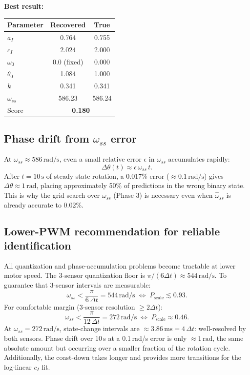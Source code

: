 \documentclass[11pt,a4paper]{article}
\begin{document}
\textbf{Best result:}
\begin{center}
\begin{tabular}{lcc}
\hline
Parameter & Recovered & True \\ \hline
$a_I$ & 0.764 & 0.755 \\
$c_I$ & 2.024 & 2.000 \\
$\omega_0$ & 0.0 (fixed) & 0.000 \\
$\theta_0$ & 1.084 & 1.000 \\
$k$ & 0.341 & 0.341 \\
$\omega_{ss}$ & 586.23 & 586.24 \\
\hline
Score & \multicolumn{2}{c}{\textbf{0.180}} \\
\hline
\end{tabular}
\end{center}

\subsection{Phase drift from $\omega_{ss}$ error}

At $\omega_{ss} \approx 586\,\text{rad/s}$, even a small relative error
$\epsilon$ in $\omega_{ss}$ accumulates rapidly:
\[
  \Delta\theta(t) \approx \epsilon\,\omega_{ss}\,t.
\]
After $t = 10\,\text{s}$ of steady-state rotation, a 0.017\% error
($\approx 0.1\,\text{rad/s}$) gives $\Delta\theta \approx 1\,\text{rad}$,
placing approximately 50\% of predictions in the wrong binary state.
This is why the grid search over $\omega_{ss}$ (Phase 3) is necessary
even when $\hat\omega_{ss}$ is already accurate to 0.02\%.

\subsection{Lower-PWM recommendation for reliable identification}

All quantization and phase-accumulation problems become tractable at lower
motor speed.  The 3-sensor quantization floor is $\pi/(6\Delta t) \approx 544\,\text{rad/s}$.
To guarantee that 3-sensor intervals are measurable:
\[
  \omega_{ss} < \frac{\pi}{6\,\Delta t} = 544\,\text{rad/s}
  \;\Longleftrightarrow\;
  P_{\text{scale}} \lesssim 0.93.
\]
For comfortable margin (3-sensor resolution $\geq 2\Delta t$):
\[
  \omega_{ss} < \frac{\pi}{12\,\Delta t} = 272\,\text{rad/s}
  \;\Longleftrightarrow\;
  P_{\text{scale}} \approx 0.46.
\]
At $\omega_{ss} = 272\,\text{rad/s}$, state-change intervals are $\approx 3.86\,\text{ms}
= 4\,\Delta t$: well-resolved by both sensors.  Phase drift over 10\,s at
a 0.1\,rad/s error is only $\approx 1\,\text{rad}$, the same absolute amount
but occurring over a smaller fraction of the rotation cycle.
Additionally, the coast-down takes longer and provides more transitions for
the log-linear $c_I$ fit.
\end{document}
